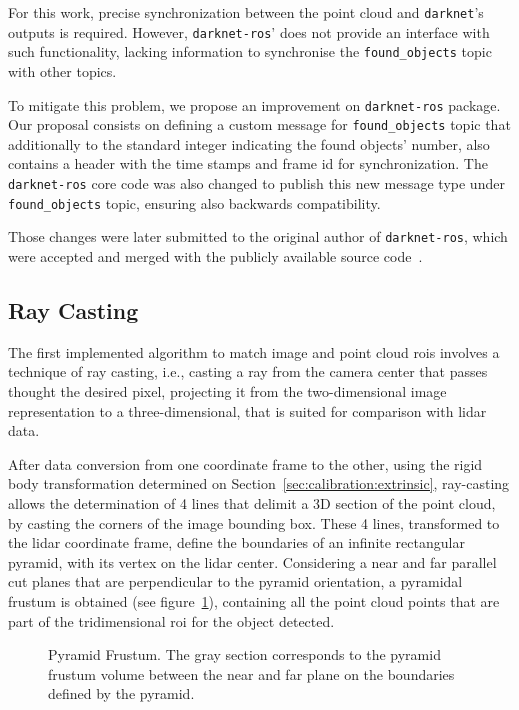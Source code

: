 For this work, precise synchronization between the point cloud and \texttt{darknet}'s outputs is required. However, \texttt{darknet-ros}' does not provide an interface with such functionality, lacking information to synchronise the \texttt{found\_objects} topic with other topics.

To mitigate this problem, we propose an improvement on \texttt{darknet-ros} package. Our proposal consists on defining a custom message for \texttt{found\_objects} topic that additionally to the standard integer indicating the found objects' number, also contains a header with the time stamps and frame id for synchronization. The \texttt{darknet-ros} core code was also changed to publish this new message type under \texttt{found\_objects} topic, ensuring also backwards compatibility.

Those changes were later submitted to the original author of \texttt{darknet-ros}, which were accepted and merged with the publicly available source code~\cite{MarkoBjelonic}.


\subsection{Ray Casting}
\label{subsec:object-detection:ray-casting}
The first implemented algorithm to match image and point cloud \acp{roi} involves a technique of ray casting, i.e., casting a ray from the camera center that passes thought the desired pixel, projecting it from the two-dimensional image representation to a three-dimensional, that is suited for comparison with \ac{lidar} data.

After data conversion from one coordinate frame to the other, using the rigid body transformation determined on Section~\ref{sec:calibration:extrinsic}, ray-casting allows the determination of 4 lines that delimit a 3D section of the point cloud, by casting the corners of the image bounding box. These 4 lines, transformed to the \ac{lidar} coordinate frame, define the boundaries of an infinite rectangular pyramid, with its vertex on the \ac{lidar} center. Considering a near and far parallel cut planes that are perpendicular to the pyramid orientation, a pyramidal frustum is obtained (see figure~\ref{fig:pyramid-frustum}), containing all the point cloud points that are part of the tridimensional \ac{roi} for the object detected.  

\begin{figure}[H]
	\centering
	\def\svgwidth{0.3\columnwidth}
	\graphicspath{{img/image-object-to-point-cloud/}}
	
	\caption{Pyramid Frustum. The gray section corresponds to the pyramid frustum volume between the near and far plane on the boundaries defined by the pyramid.}
	\label{fig:pyramid-frustum}
\end{figure}


